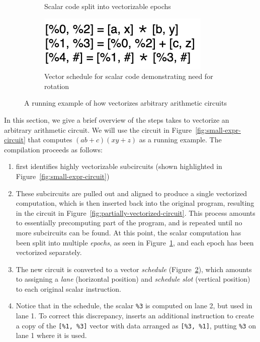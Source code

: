 \begin{figure}
\begin{subfigure}{0.3\columnwidth}
        \caption{Scalar code split into vectorizable epochs}
        \label{fig:code-split-epochs}
    \end{subfigure}
    \begin{subfigure}{0.6\columnwidth}
        \includegraphics[scale=0.3]{figures/compilation_overview/vector_schedule_needing_rotates.drawio.png}
        \caption{Vector schedule for scalar code demonstrating need for rotation}
        \label{fig:vector-sched-needing-rotates}
    \end{subfigure}
    \caption{A running example of how \system vectorizes arbitrary arithmetic circuits}
    \label{fig:toy-running-example}
\end{figure}

In this section, we give a brief overview of the steps \system takes to vectorize an arbitrary arithmetic circuit.
We will use the circuit in Figure~\ref{fig:small-expr-circuit} that computes $(ab+c)(xy+z)$ as a running example.
The compilation proceeds as follows:
\begin{enumerate}
    \item \system first identifies highly vectorizable subcircuits (shown highlighted in Figure~\ref{fig:small-expr-circuit})
    \item These subcircuits are pulled out and aligned to produce a single vectorized computation, which is then inserted back into the original program, resulting in the circuit in Figure~\ref{fig:partially-vectorized-circuit}. 
    This process amounts to essentially precomputing part of the program, and is repeated until no more subcircuits can be found. 
    At this point, the scalar computation has been split into multiple {\em epochs}, as seen in Figure~\ref{fig:code-split-epochs}, and each epoch has been vectorized separately.
    \item The new circuit is converted to a vector {\em schedule} (Figure~\ref{fig:vector-sched-needing-rotates}), which amounts to assigning a {\em lane} (horizontal position) and {\em schedule slot} (vertical position) to each original scalar instruction.
    \item Notice that in the schedule, the scalar \texttt{\%3} is computed on lane 2, but used in lane 1. To correct this discrepancy, \system inserts an additional instruction to create a copy of the \texttt{[\%1, \%3]} vector with data arranged as \texttt{[\%3, \%1]}, putting \texttt{\%3} on lane 1 where it is used.
\end{enumerate}

